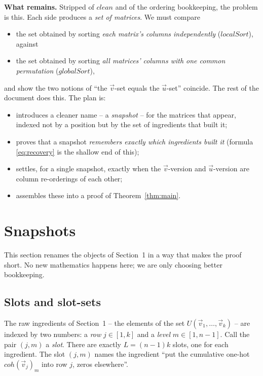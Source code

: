\documentclass{article}
\begin{document}
\medskip
\noindent\textbf{What remains.}  Stripped of $clean$ and of the ordering bookkeeping,
the problem is this.  Each side produces a \emph{set of matrices}.  We must compare
\begin{itemize}
  \item the set obtained by sorting \emph{each matrix's columns independently}
        ($localSort$), against
  \item the set obtained by sorting \emph{all matrices' columns with one common
        permutation} ($globalSort$),
\end{itemize}
and show the two notions of ``the $\vec v$-set equals the $\vec u$-set'' coincide.
The rest of the document does this.  The plan is:
\begin{itemize}
  \item[\S\ref{sec:snapshots}] introduces a cleaner name -- a \emph{snapshot} --
        for the matrices that appear, indexed not by a position but by the set of
        ingredients that built it;
  \item[\S\ref{sec:remember}] proves that a snapshot \emph{remembers exactly which
        ingredients built it} (formula \eqref{eq:recovery} is the shallow end of
        this);
  \item[\S\ref{sec:align}] settles, for a single snapshot, exactly when the
        $\vec v$-version and $\vec u$-version are column re-orderings of each other;
  \item[\S\ref{sec:solution}] assembles these into a proof of
        Theorem~\ref{thm:main}.
\end{itemize}


\section{Snapshots}
\label{sec:snapshots}

This section renames the objects of Section~1 in a way that makes the proof short.
No new mathematics happens here; we are only choosing better bookkeeping.

\subsection*{Slots and slot-sets}

The raw ingredients of Section~1 -- the elements of the set
$U(\vec v_1,\ldots,\vec v_k)$ -- are indexed by two numbers: a \emph{row}
$j\in[1,k]$ and a \emph{level} $m\in[1,n-1]$.  Call the pair $(j,m)$ a \emph{slot}.
There are exactly $L=(n-1)k$ slots, one for each ingredient.  The slot $(j,m)$
names the ingredient ``put the cumulative one-hot $coh(\vec v_j)_m$ into row $j$,
zeros elsewhere''.
\end{document}
